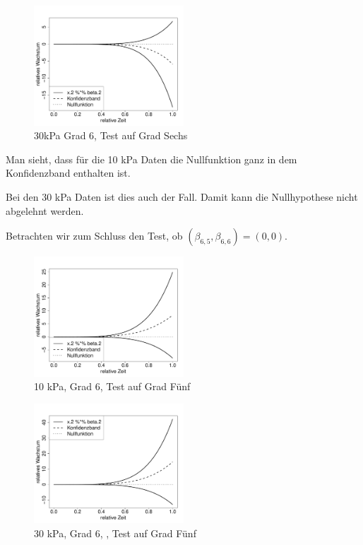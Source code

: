 \documentclass[12pt,a4paper]{article}
\theoremstyle{definition}
\theoremstyle{definition}
\theoremstyle{definition}
\theoremstyle{definition}
\begin{document}
\begin{figure}[H] 
  \centering
     \includegraphics[width=0.5\textwidth]{30kPa-Grad-6-1-KB}
  \caption{30kPa Grad 6, Test auf Grad Sechs}
  \label{30kPa Grad 6.1}
\end{figure}

Man sieht, dass für die 10 kPa Daten die Nullfunktion ganz in dem Konfidenzband enthalten ist.

Bei den 30 kPa Daten ist dies auch der Fall. Damit kann die Nullhypothese nicht abgelehnt werden.

Betrachten wir zum Schluss den Test, ob $(\beta_{6,5}, \beta_{6,6}) = (0,0)$.

\begin{figure}[H] 
  \centering
     \includegraphics[width=0.5\textwidth]{10kPa-Grad-6-2-KB}
  \caption{10 kPa, Grad 6, Test auf Grad Fünf}
  \label{10kPa Grad 6.2}
\end{figure}

\begin{figure}[H] 
  \centering
     \includegraphics[width=0.5\textwidth]{30kPa-Grad-6-2-KB}
  \caption{30 kPa, Grad 6, , Test auf Grad Fünf}
  \label{30kPa Grad 6.2}
\end{figure}
\end{document}
